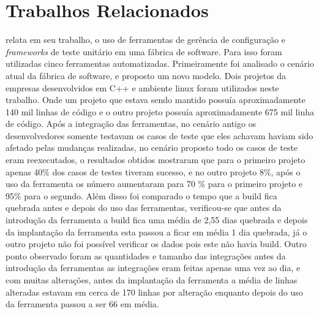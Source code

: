 
\chapter{Trabalhos Relacionados}\label{trabalhorel}

 relata em seu trabalho, o uso de ferramentas de gerência de configuração e \textit{frameworks} de teste unitário em uma fábrica de software. Para isso foram utilizadas cinco ferramentas automatizadas. Primeiramente foi analisado o cenário atual da fábrica de software, e proposto um novo modelo. Dois projetos da empresas desenvolvidos em C++ e ambiente linux foram utilizados neste trabalho. Onde um projeto que estava sendo mantido possuía aproximadamente 140 mil linhas de código e o outro projeto possuía aproximadamente 675 mil linha de código. Após a integração das ferramentas, no cenário antigo os desenvolvedores somente testavam os casos de teste que eles achavam haviam sido afetado pelas mudanças realizadas, no cenário proposto todo os casos de teste eram reexecutados, o resultados obtidos mostraram que para o primeiro projeto apenas 40\% dos casos de testes tiveram sucesso, e no outro projeto 8\%, após o uso da ferramenta os número aumentaram para 70 \% para o primeiro projeto e 95\% para o segundo. Além disso foi comparado o tempo que a build fica quebrada antes e depois do uso das ferramentas, verificou-se que antes da introdução da ferramenta a build  fica uma média de 2,55 dias quebrada e depois da implantação da ferramenta esta passou a ficar em média 1 dia quebrada, já o outro projeto não foi possível verificar os dados pois este não havia build. Outro ponto observado foram as quantidades e tamanho das integrações antes da introdução da ferramentas as integrações eram feitas apenas uma vez ao dia, e com muitas alterações, antes da implantação da ferramenta a média de linhas alteradas estavam em cerca de 170 linhas por alteração enquanto depois do uso da ferramenta passou a ser 66 em média.
